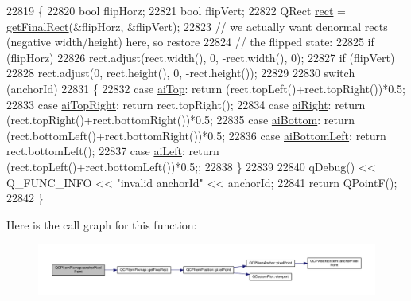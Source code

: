 \begin{DoxyCode}
22819 \{
22820   \textcolor{keywordtype}{bool} flipHorz;
22821   \textcolor{keywordtype}{bool} flipVert;
22822   QRect \hyperlink{_gen_blob_8m_aea8f6815d9a63491fc422c5572c6b3c3}{rect} = \hyperlink{class_q_c_p_item_pixmap_a245ef0c626cab7096a810442f2f6a2d9}{getFinalRect}(&flipHorz, &flipVert);
22823   \textcolor{comment}{// we actually want denormal rects (negative width/height) here, so restore}
22824   \textcolor{comment}{// the flipped state:}
22825   \textcolor{keywordflow}{if} (flipHorz)
22826     rect.adjust(rect.width(), 0, -rect.width(), 0);
22827   \textcolor{keywordflow}{if} (flipVert)
22828     rect.adjust(0, rect.height(), 0, -rect.height());
22829   
22830   \textcolor{keywordflow}{switch} (anchorId)
22831   \{
22832     \textcolor{keywordflow}{case} \hyperlink{class_q_c_p_item_pixmap_a0ea7f65edb7395e02de521915f221174a90e523ebaed7921ca90cf1b08944ece5}{aiTop}:         \textcolor{keywordflow}{return} (rect.topLeft()+rect.topRight())*0.5;
22833     \textcolor{keywordflow}{case} \hyperlink{class_q_c_p_item_pixmap_a0ea7f65edb7395e02de521915f221174a33c256cdec46fa1587534fcd6e776799}{aiTopRight}:    \textcolor{keywordflow}{return} rect.topRight();
22834     \textcolor{keywordflow}{case} \hyperlink{class_q_c_p_item_pixmap_a0ea7f65edb7395e02de521915f221174ab22d91dae59c0d4a65416a0d677b2d05}{aiRight}:       \textcolor{keywordflow}{return} (rect.topRight()+rect.bottomRight())*0.5;
22835     \textcolor{keywordflow}{case} \hyperlink{class_q_c_p_item_pixmap_a0ea7f65edb7395e02de521915f221174a04b5e041b4dd0def2b60c5cfea2bc1a4}{aiBottom}:      \textcolor{keywordflow}{return} (rect.bottomLeft()+rect.bottomRight())*0.5;
22836     \textcolor{keywordflow}{case} \hyperlink{class_q_c_p_item_pixmap_a0ea7f65edb7395e02de521915f221174ae14886b381136898e37e89af5046a1cc}{aiBottomLeft}:  \textcolor{keywordflow}{return} rect.bottomLeft();
22837     \textcolor{keywordflow}{case} \hyperlink{class_q_c_p_item_pixmap_a0ea7f65edb7395e02de521915f221174a9efe71239b9409ebe1c2813a37807f2a}{aiLeft}:        \textcolor{keywordflow}{return} (rect.topLeft()+rect.bottomLeft())*0.5;;
22838   \}
22839   
22840   qDebug() << Q\_FUNC\_INFO << \textcolor{stringliteral}{"invalid anchorId"} << anchorId;
22841   \textcolor{keywordflow}{return} QPointF();
22842 \}
\end{DoxyCode}


Here is the call graph for this function\+:\nopagebreak
\begin{figure}[H]
\begin{center}
\leavevmode
\includegraphics[width=350pt]{class_q_c_p_item_pixmap_a88abce3c1027f371cddcf6dad35ffbb1_cgraph}
\end{center}
\end{figure}


